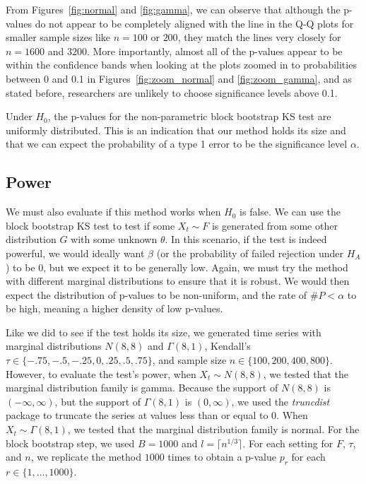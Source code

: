 \documentclass[12pt, titlepage, letterpaper]{article}
\begin{document}
{From Figures~\ref{fig:normal} and \ref{fig:gamma}, we can observe that 
although the p-values do not appear to be 
completely aligned with the line
in the Q-Q plots for smaller sample sizes like $n = 100$ or $200$, they match
the lines very closely for $n = 1600$ and $3200$. More importantly, almost
all of the p-values appear to be within the confidence bands when looking at the
plots zoomed in to probabilities between 0 and 0.1 in 
Figures~\ref{fig:zoom_normal} and \ref{fig:zoom_gamma}, and as stated 
before, 
researchers are unlikely to choose significance levels above 0.1. 


Under $H_0$, the p-values for the non-parametric block bootstrap KS test are
uniformly distributed. This is an indication that our method 
holds its size and that we can expect the probability
of a type 1 error to be the significance level $\alpha$.


\subsection{Power}
We must also evaluate if this method works when $H_0$ is false. We can use
the block bootstrap KS test to test if some $X_t \sim F$ is generated from 
some other 
distribution $G$ with some unknown $\theta$. In this scenario, if the test is 
indeed powerful,
we would ideally want $\beta$ 
(or the probability of failed rejection under $H_A$) 
to be 0, but we
expect it to be generally low. Again, we must try the method with different
marginal distributions to ensure that it is robust.
We would then expect the distribution of p-values to be non-uniform, and the 
rate
of $\#P < \alpha$ to be high, meaning a higher density of low p-values.


Like we did to see if the test holds its size, we generated time series with 
marginal distributions $N(8, 8)$ and 
$\Gamma(8, 1)$, Kendall's $\tau \in \{-.75, -.5, -.25, 0, .25, .5, 
.75\}$, and
sample size $n \in \{100, 200, 400, 800\}$. However, 
to evaluate the test's power, when $X_t \sim N(8, 8)$, we tested that the 
marginal distribution family is gamma. Because the support of $N(8, 8)$ is
$(-\infty, \infty)$, but the support of $\Gamma(8, 1)$ is $(0, \infty)$, we used
the \textsl{truncdist} package \citep{truncdist} to truncate the series at 
values less than or equal to 0.
When $X_t \sim \Gamma(8, 1)$, we tested
that the marginal distribution family is normal. For the block bootstrap step,
we used $B = 1000$ and $l = \lceil n^{1/3} \rceil$.
For each setting for $F$, $\tau$, and $n$, we replicate the method $1000$ times 
to obtain a p-value $p_r$ for each $r \in \{1, \ldots, 1000\}$.


}
\end{document}
